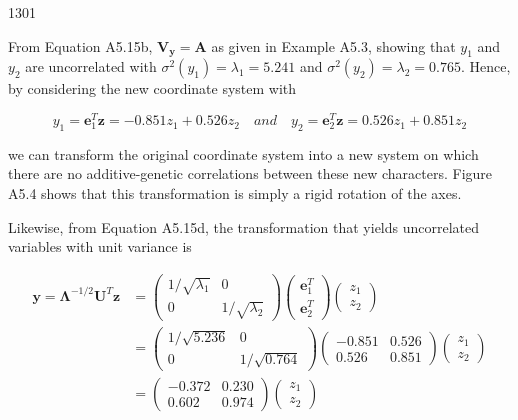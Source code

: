 \documentclass{article}
\begin{document}
1301

From Equation A5.15b,  $ \mathbf{V}_{\mathbf{y}} = \mathbf{A} $ as given in Example A5.3, showing that  $ y_1 $ and  $ y_2 $ are uncorrelated with  $ \sigma^2(y_1) = \lambda_1 = 5.241 $ and  $ \sigma^2(y_2) = \lambda_2 = 0.765 $. Hence, by considering the new coordinate system with

\begin{equation}
y_{1}=\mathbf{e}_{1}^{T}\mathbf{z}=-0.851z_{1}+0.526z_{2}\quad and\quad y_{2}=\mathbf{e}_{2}^{T}\mathbf{z}=0.526z_{1}+0.851z_{2}
\end{equation}

we can transform the original coordinate system into a new system on which there are no additive-genetic correlations between these new characters. Figure A5.4 shows that this transformation is simply a rigid rotation of the axes.

Likewise, from Equation A5.15d, the transformation that yields uncorrelated variables with unit variance is

\begin{equation}
\begin{aligned}\mathbf{y}=\boldsymbol{\Lambda}^{-1/2}\mathbf{U}^{T}\mathbf{z}&=\begin{pmatrix}{{{1/\sqrt{\lambda_{1}}}}}&{{{0}}} \\{{{0}}}&{{{1/\sqrt{\lambda_{2}}}}}\end{pmatrix}\begin{pmatrix}{{{\mathbf{e}_{1}^{T}}}} \\{{{\mathbf{e}_{2}^{T}}}}\end{pmatrix}\begin{pmatrix}{{{z_{1}}}} \\{{{z_{2}}}}\end{pmatrix}\\&=\begin{pmatrix}{{{1/\sqrt{5.236}}}}&{{{0}}} \\{{{0}}}&{{{1/\sqrt{0.764}}}}\end{pmatrix}\begin{pmatrix}{{{-0.851}}}&{{{0.526}}} \\{{{0.526}}}&{{{0.851}}}\end{pmatrix}\begin{pmatrix}{{{z_{1}}}} \\{{{z_{2}}}}\end{pmatrix}\\&=\begin{pmatrix}{{{-0.372}}}&{{{0.230}}} \\{{{0.602}}}&{{{0.974}}}\end{pmatrix}\begin{pmatrix}{{{z_{1}}}} \\{{{z_{2}}}}\end{pmatrix}\end{aligned}
\end{equation}
\end{document}
